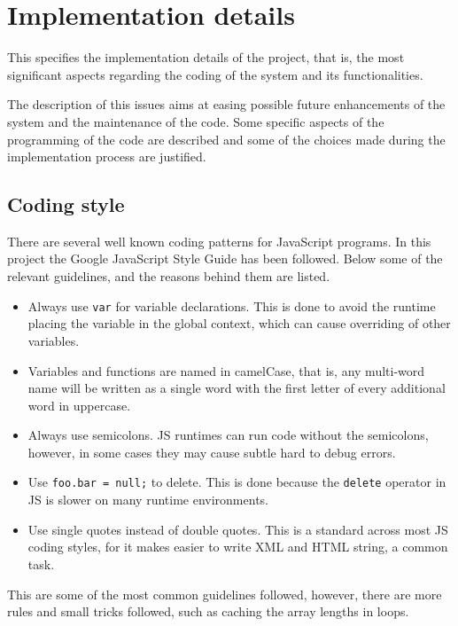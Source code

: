 \chapter{Implementation details}\label{ch:implementation}

This specifies the implementation details of the project, that is, the most significant aspects regarding the coding of the system and its functionalities.

The description of this issues aims at easing possible future enhancements of the system and the maintenance of the code. Some specific aspects of the programming of the code are described and some of the choices made during the implementation process are justified.

\section{Coding style}

There are several well known coding patterns for JavaScript programs. In this project the Google JavaScript Style Guide \cite{googlestyle} has been followed. Below some of the relevant guidelines, and the reasons behind them are listed.

\begin{itemize}
\item Always use \texttt{var} for variable declarations. This is done to avoid the runtime placing the variable in the global context, which can cause overriding of other variables.
\item Variables and functions are named in camelCase, that is, any multi-word name will be written as a single word with the first letter of every additional word in uppercase.
\item Always use semicolons. JS runtimes can run code without the semicolons, however, in some cases they may cause subtle hard to debug errors.
\item Use \texttt{foo.bar = null;} to delete. This is done because the \texttt{delete} operator in JS is slower on many runtime environments. 
\item Use single quotes instead of double quotes. This is a standard across most JS coding styles, for it makes easier to write XML and HTML string, a common task.
\end{itemize}

This are some of the most common guidelines followed, however, there are more rules and small tricks followed, such as caching the array lengths in loops.

